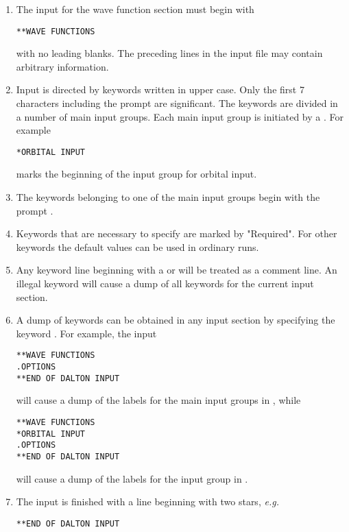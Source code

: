 \begin{enumerate}
\item {The input for the wave function section must begin with

\begin{inputex} \begin{verbatim}
**WAVE FUNCTIONS
\end{verbatim} \end{inputex}
   with no leading blanks.  The preceding lines in the input file may
   contain arbitrary information.
}
\item{ Input is directed by keywords written in upper case.
   Only the first 7 characters including the prompt are significant.
   The keywords are divided in a number of main input groups. Each main
   input group is initiated by a {\starkey}. For example

\begin{inputex} \begin{verbatim}
*ORBITAL INPUT
\end{verbatim} \end{inputex}
   marks the beginning of the input group for orbital input.
}
\item { The keywords belonging to one of the main input groups begin with
   the prompt {\dotkey}.
}
\item { Keywords that are necessary to specify are marked by "Required".
   For other keywords the default values can be used in ordinary runs.
}
\item {Any keyword line beginning with a \quotekw{!} or
   \quotekw{\#} will be treated as a
   comment line.  An illegal keyword will cause a dump of all keywords
   for the current input section.
}
\item{A dump of keywords can be obtained in any input section by
specifying the keyword .  For example, the input

\begin{inputex} \begin{verbatim}
**WAVE FUNCTIONS
.OPTIONS
**END OF DALTON INPUT
\end{verbatim} \end{inputex}
   will cause a dump of the labels for the main input groups in {\sir},
   while

\begin{inputex} \begin{verbatim}
**WAVE FUNCTIONS
*ORBITAL INPUT
.OPTIONS
**END OF DALTON INPUT
\end{verbatim} \end{inputex}
   will cause a dump of the labels for the  input group
   in {\sir}.
}
\item{ The {\sir} input is finished with a line beginning with two stars,
   {\it e.g.\/}

\begin{inputex} \begin{verbatim}
**END OF DALTON INPUT
\end{verbatim} \end{inputex}
}
\end{enumerate}


